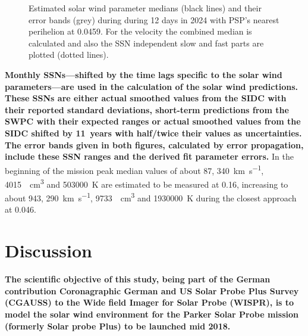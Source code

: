 \begin{figure}
	\caption{Estimated solar wind parameter medians (black lines) and their error bands (grey) during during 12 days in 2024 with PSP's nearest perihelion at \SI{0.0459}{\au}. For the velocity the combined median is calculated and also the SSN independent slow and fast parts are plotted (dotted lines).}
	\label{fig:SPP_perihelia_prediction_nearest_e_plot}
\end{figure}
\textbf{Monthly SSNs---shifted by the time lags specific to the solar wind parameters---are used in the calculation of the solar wind predictions. These SSNs are either actual smoothed values from the SIDC with their reported standard deviations, short-term predictions from the SWPC with their expected ranges or actual smoothed values from the SIDC shifted by 11~years with half/twice their values as uncertainties. The error bands given in both figures, calculated by error propagation, include these SSN ranges and the derived fit parameter errors.} In the beginning of the mission peak median values of about \SI{87}{\nT}, \SI{340}{\km\per\s}, \SI{4015}{\per\cm\cubed} and \SI{503000}{\K} are estimated to be measured at \SI{0.16}{\au}, increasing to about \SI{943}{\nT}, \SI{290}{\km\per\s}, \SI{9733}{\per\cm\cubed} and \SI{1930000}{\K} during the closest approach at \SI{0.046}{\au}.


\section{Discussion}
\label{sec:discussion}
\textbf{The scientific objective of this study, being part of the German contribution Coronagraphic German and US Solar Probe Plus Survey (CGAUSS) to the Wide field Imager for Solar Probe (WISPR), is to model the solar wind environment for the Parker Solar Probe mission (formerly Solar probe Plus) to be launched mid 2018.}

